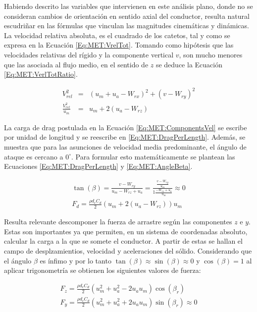 Habiendo descrito las variables que intervienen en este análisis plano, donde no se consideran cambios de orientación en sentido axial del conductor, resulta natural escudriñar en las fórmulas que vinculan las magnitudes cinemáticas y dinámicas. La velocidad relativa absoluta, es el cuadrado de los catetos, tal y como se expresa en la Ecuación \eqref{Eq:MET:VrelTot}. Tomando como hipótesis que las velocidades relativas del rígido y la componente vertical $v$, son mucho menores que las asociada al flujo medio, en el sentido de $z$ se deduce la Ecuación \eqref{Eq:MET:VerlTotRatio}. 


\begin{eqnarray}
	\label{Eq:MET:VrelTot}
	V_{rel}^2&=&(u_m+u_a-W_{rx})^2+(v-W_{ry})^2\\
		\label{Eq:MET:VerlTotRatio}
	\frac{V_{rel}^2}{u_m}&=&u_m + 2 (u_a-W_{rz})
\end{eqnarray}

La carga de drag postulada en la Ecuación \eqref{Eq:MET:ComponentsVel} se escribe por unidad de longitud y se reescribe en \eqref{Eq:MET:DragPerLength}. Además, se muestra que para las asunciones de velocidad media predominante, el ángulo de ataque es cercano a $0^{\circ}$. Para formular esto matemáticamente se plantean las Ecuaciones \eqref{Eq:MET:DragPerLength} y \eqref{Eq:MET:AngleBeta}.

\begin{eqnarray}
	\label{Eq:MET:AngleBeta}
	\tan (\beta) = \frac{v-W_{ry}}{u_m - W_{rz} + u_a}=\frac{\frac{v-W_{ry}}{u_m}}{1 \frac{- W_{rz} + u_a}{u_m}}\approx 0 \\
	 \label{Eq:MET:DragPerLength}
	F_d = \frac{\rho d_c C_d}{2} (u_m + 2 (u_a-W_{rz}))u_m
\end{eqnarray}

Resulta relevante descomponer la fuerza de arrastre según las componentes $z$ e $y$. Estas son importantes ya que permiten, en un sistema de coordenadas absoluto, calcular la carga a la que se somete el conductor. A partir de estas se hallan el campo de desplzamientios, velocidad y aceleraciones del sólido. Considerando que el ángulo $\beta$ es ínfimo y por lo tanto $\tan(\beta)\approx\sin(\beta)\approx 0$ y $\cos(\beta)=1$ al aplicar trigonometría se obtienen los siguientes valores de fuerza:

\begin{eqnarray}
	F_z = \frac{\rho d_c C_d}{2} (u_m^2+u_a^2-2u_au_m)\cos(\beta_r)\\
	F_y = \frac{\rho d_c C_d}{2} (u_m^2+u_a^2+2u_au_m)\sin(\beta_r)\approx 0
\end{eqnarray}

